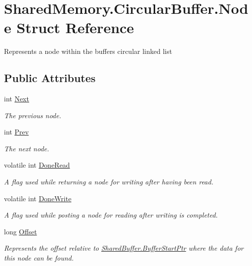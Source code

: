 \hypertarget{struct_shared_memory_1_1_circular_buffer_1_1_node}{}\section{Shared\+Memory.\+Circular\+Buffer.\+Node Struct Reference}
\label{struct_shared_memory_1_1_circular_buffer_1_1_node}


Represents a node within the buffer\textquotesingle{}s circular linked list  


\subsection*{Public Attributes}
\begin{DoxyCompactItemize}
\item 
int \hyperlink{struct_shared_memory_1_1_circular_buffer_1_1_node_a41f7820db0d0ea1e166923e1b19293e6}{Next}
\begin{DoxyCompactList}\small\item\em The previous node. \end{DoxyCompactList}\item 
int \hyperlink{struct_shared_memory_1_1_circular_buffer_1_1_node_a9ccf25ec0824c8c98c15783889296f01}{Prev}
\begin{DoxyCompactList}\small\item\em The next node. \end{DoxyCompactList}\item 
volatile int \hyperlink{struct_shared_memory_1_1_circular_buffer_1_1_node_aae426a592827275557a3bb265c25fa54}{Done\+Read}
\begin{DoxyCompactList}\small\item\em A flag used while returning a node for writing after having been read. \end{DoxyCompactList}\item 
volatile int \hyperlink{struct_shared_memory_1_1_circular_buffer_1_1_node_a5dc63ec61fe5fdaa3e9454ec79bfa202}{Done\+Write}
\begin{DoxyCompactList}\small\item\em A flag used while posting a node for reading after writing is completed. \end{DoxyCompactList}\item 
long \hyperlink{struct_shared_memory_1_1_circular_buffer_1_1_node_aa39234c3ab7451fabfd90bfebf6047cc}{Offset}
\begin{DoxyCompactList}\small\item\em Represents the offset relative to \hyperlink{class_shared_memory_1_1_shared_buffer_a2332338ba9693ee545a34faa7c64483a}{Shared\+Buffer.\+Buffer\+Start\+Ptr} where the data for this node can be found. \end{DoxyCompactList}\item 

\end{DoxyCompactItemize}
